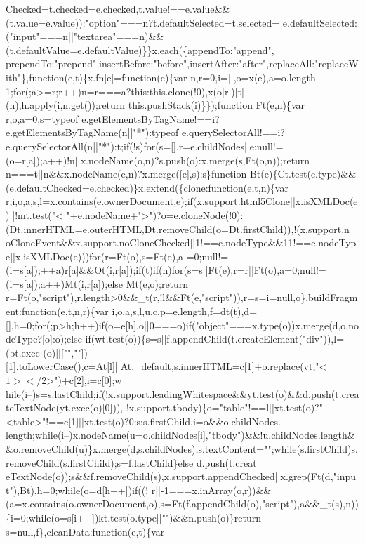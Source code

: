 \begin{DoxyCode}
{      Checked=t.checked=e.checked,t.value!==e.value&&(t.value=e.value)):"option"===n?t.defaultSelected=t.selected=
      e.defaultSelected:("input"===n||"textarea"===n)&&(t.defaultValue=e.defaultValue)\}\}x.each(\{appendTo:"append",
      prependTo:"prepend",insertBefore:"before",insertAfter:"after",replaceAll:"replaceWith"\},function(e,t)\{x.fn[e]=function(e)\{var
       n,r=0,i=[],o=x(e),a=o.length-1;for(;a>=r;r++)n=r===a?this:this.clone(!0),x(o[r])[t](n),h.apply(i,n.get());return this.pushStack(i)\}\});function Ft(e,n)\{var r,o,a=0,s=typeof
       e.getElementsByTagName!==i?e.getElementsByTagName(n||"*"):typeof
       e.querySelectorAll!==i?e.querySelectorAll(n||"*"):t;if(!s)for(s=[],r=e.childNodes||e;null!=(o=r[a]);a++)!n||x.nodeName(o,n)?s.push(o):x.merge(s,Ft(o,n));return
       n===t||n&&x.nodeName(e,n)?x.merge([e],s):s\}function
       Bt(e)\{Ct.test(e.type)&&(e.defaultChecked=e.checked)\}x.extend(\{clone:function(e,t,n)\{var
       r,i,o,a,s,l=x.contains(e.ownerDocument,e);if(x.support.html5Clone||x.isXMLDoc(e)||!mt.test("<
      "+e.nodeName+">")?o=e.cloneNode(!0):(Dt.innerHTML=e.outerHTML,Dt.removeChild(o=Dt.firstChild)),!(x.support.n
      oCloneEvent&&x.support.noCloneChecked||1!==e.nodeType&&11!==e.nodeType||x.isXMLDoc(e)))for(r=Ft(o),s=Ft(e),a
      =0;null!=(i=s[a]);++a)r[a]&&Ot(i,r[a]);if(t)if(n)for(s=s||Ft(e),r=r||Ft(o),a=0;null!=(i=s[a]);a++)Mt(i,r[a]);else Mt(e,o);return
       r=Ft(o,"script"),r.length>0&&\_t(r,!l&&Ft(e,"script")),r=s=i=null,o\},buildFragment:function(e,t,n,r)\{var
       i,o,a,s,l,u,c,p=e.length,f=dt(t),d=[],h=0;for(;p>h;h++)if(o=e[h],o||0===o)if("object"===x.type(o))x.merge(d,o.nodeType?[o]:o);else
       if(wt.test(o))\{s=s||f.appendChild(t.createElement("div")),l=(bt.exec
      (o)||["",""])[1].toLowerCase(),c=At[l]||At.\_default,s.innerHTML=c[1]+o.replace(vt,"<$1></$2>")+c[2],i=c[0];w
      hile(i--)s=s.lastChild;if(!x.support.leadingWhitespace&&yt.test(o)&&d.push(t.createTextNode(yt.exec(o)[0])),
      !x.support.tbody)\{o="table"!==l||xt.test(o)?"<table>"!==c[1]||xt.test(o)?0:s:s.firstChild,i=o&&o.childNodes.
      length;while(i--)x.nodeName(u=o.childNodes[i],"tbody")&&!u.childNodes.length&&o.removeChild(u)\}x.merge(d,s.childNodes),s.textContent="";while(s.firstChild)s.removeChild(s.firstChild);s=f.lastChild\}else
       d.push(t.creat
      eTextNode(o));s&&f.removeChild(s),x.support.appendChecked||x.grep(Ft(d,"input"),Bt),h=0;while(o=d[h++])if((!
      r||-1===x.inArray(o,r))&&(a=x.contains(o.ownerDocument,o),s=Ft(f.appendChild(o),"script"),a&&\_t(s),n))\{i=0;while(o=s[i++])kt.test(o.type||"")&&n.push(o)\}return s=null,f\},cleanData:function(e,t)\{var
}
\end{DoxyCode}
